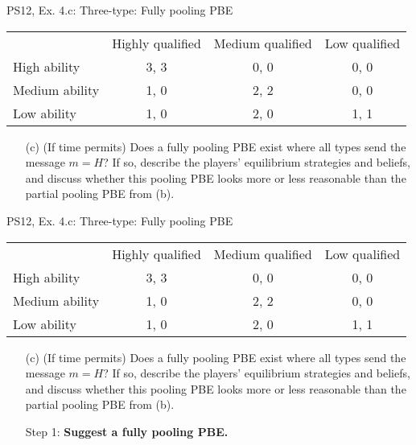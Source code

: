 \begin{frame}{PS12, Ex. 4.c: Three-type: Fully pooling PBE}
    \begin{table}
      \begin{tabular}{l|c|c|c|}
          \multicolumn{1}{c}{} & \multicolumn{1}{c}{Highly qualified} & \multicolumn{1}{c}{Medium qualified} & \multicolumn{1}{c}{Low qualified} \\\cline{2-4}
          High ability   & 3, 3 & 0, 0 & 0, 0 \\\cline{2-4}
          Medium ability & 1, 0 & 2, 2 & 0, 0 \\\cline{2-4}
          Low ability    & 1, 0 & 2, 0 & 1, 1 \\\cline{2-4}
      \end{tabular}
    \end{table}\vspace{-8pt}
    \begin{itemize}
      \item[(c)] (If time permits) Does a fully pooling PBE exist where all types send the message $m = H$? If so, describe the players’ equilibrium strategies and beliefs, and discuss whether this pooling PBE looks more or less reasonable than the partial pooling PBE from (b).
    \end{itemize}
    \vfill\null
\end{frame}
\begin{frame}{PS12, Ex. 4.c: Three-type: Fully pooling PBE}
    \begin{table}
      \begin{tabular}{l|c|c|c|}
          \multicolumn{1}{c}{} & \multicolumn{1}{c}{Highly qualified} & \multicolumn{1}{c}{Medium qualified} & \multicolumn{1}{c}{Low qualified} \\\cline{2-4}
          High ability   & 3, 3 & 0, 0 & 0, 0 \\\cline{2-4}
          Medium ability & 1, 0 & 2, 2 & 0, 0 \\\cline{2-4}
          Low ability    & 1, 0 & 2, 0 & 1, 1 \\\cline{2-4}
      \end{tabular}
    \end{table}\vspace{-8pt}
    \begin{itemize}
      \item[(c)] (If time permits) Does a fully pooling PBE exist where all types send the message $m = H$? If so, describe the players’ equilibrium strategies and beliefs, and discuss whether this pooling PBE looks more or less reasonable than the partial pooling PBE from (b).
      \item[Step 1:] \textbf{Suggest a fully pooling PBE.}
    \end{itemize}
    \vfill\null
\end{frame}
